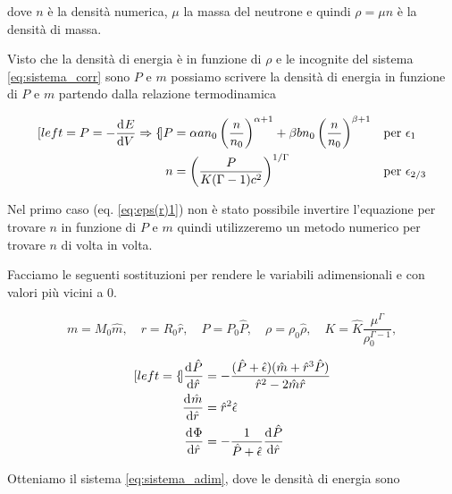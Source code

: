 \documentclass[a4paper, titlepage]{article}
\begin{document}
dove $n$ è la densità numerica, $\mu$ la massa del neutrone e quindi
$\rho = \mu n$ è la densità di massa.

Visto che la densità di energia è in funzione di $\rho$ e le incognite del
sistema \ref{eq:sistema_corr} sono $P$ e $m$ possiamo scrivere la densità di
energia in funzione di $P$ e $m$ partendo dalla relazione termodinamica

\begin{subequations}
    \label{eq:eps(r)}
    \begin{align}[left = {P = - \dv[]{E}{V} \Rightarrow \empheqlbrace}]
        P &= \alpha a n_0 \left( \frac{n}{n_0} \right)^{\alpha + 1}
        + \beta b n_0 \left( \frac{n}{n_0} \right)^{\beta + 1}
        && \text{per } \epsilon_1 \label{eq:eps(r)1} \\
        n &= \left( \frac{P}{K(\Gamma - 1) c^2} \right)^{1 / \Gamma}
        && \text{per } \epsilon_{2/3} \label{eq:eps(r)23}
    \end{align}
\end{subequations}

Nel primo caso (eq. \ref{eq:eps(r)1}) non è stato possibile invertire
l'equazione per trovare $n$ in funzione di $P$ e $m$ quindi utilizzeremo un
metodo numerico per trovare $n$ di volta in volta.

Facciamo le seguenti sostituzioni per rendere le variabili adimensionali e con
valori più vicini a 0.

\begin{equation*}
    m=M_0\hat m, \quad 
    r=R_0\hat r, \quad 
    P=P_0\hat P, \quad
    \rho=\rho_0 \hat{\rho}, \quad
    K = \hat{K}\frac{\mu^\Gamma}{\rho_0^{\Gamma-1}},
\end{equation*}

\begin{subequations}
    \begin{align}[left = {\empheqlbrace}]
        \dv[]{\hat P}{\hat r} &=
        - \frac{(\hat P + \hat{\epsilon})(\hat m + \hat r^3 \hat P)}
        {\hat r^2-2\hat m\hat r} \label{eq:P_ad} \\
        \dv[]{\hat m}{\hat r} &= \hat r^2 \hat{\epsilon} \label{eq:m_ad} \\
        \dv[]{\Phi}{\hat r} &= - \frac{1}{\hat P + \hat{\epsilon}}
        \dv[]{\hat P}{\hat r} \label{eq:Phi_ad}
    \end{align}
    \label{eq:sistema_adim}
\end{subequations}

Otteniamo il sistema \ref{eq:sistema_adim}, dove le densità di energia sono
\end{document}
